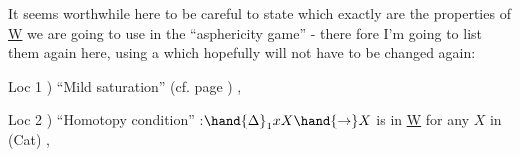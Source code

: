 It seems worthwhile here to be careful to state which exactly are
the properties of \underline{W} we are going to use in the ``asphericity game'' - there%
fore I'm going to list them again here,  using a 
 which\hand{,} hopefully\hand{,} will not have to be changed again:

Loc 1 ) ``Mild saturation'' (cf. page ) ,

Loc 2 ) ``Homotopy condition'' :$\hand{\Delta}_1 x X \hand{\rightarrow} X$ is in \underline{W} for any $X$ in (Cat) ,

